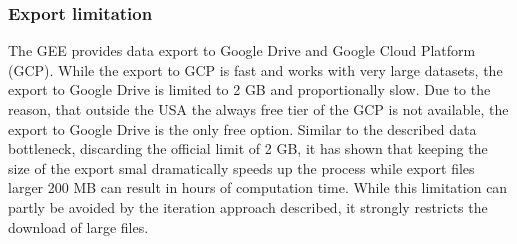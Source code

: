 \documentclass[11pt,twoside,a4paper,final]{report}
\begin{document}
\subsubsection{Export limitation}

The GEE provides data export to Google Drive and Google Cloud Platform (GCP). While the export to GCP is fast and works with very large datasets, the export to Google Drive is limited to 2 GB and proportionally slow. Due to the reason, that outside the USA the always free tier of the GCP is not available, the export to Google Drive is the only free option. Similar to the described data bottleneck, discarding the official limit of 2 GB, it has shown that keeping the size of the export smal dramatically speeds up the process while export files larger 200 MB can result in hours of computation time. While this limitation can partly be avoided by the iteration approach described, it strongly restricts the download of large files.






   



\appendix






\printindex


\end{document}
